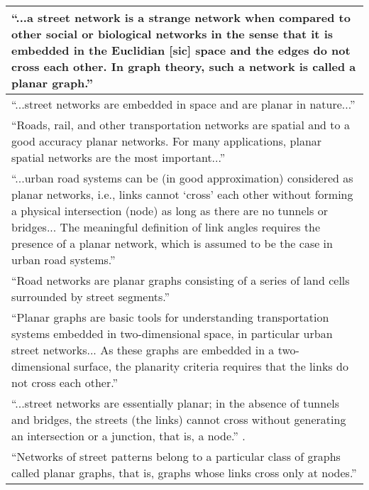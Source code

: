 \begin{tabular}{ | p{\textwidth} | }
\enquote{...a street network is a strange network when compared to other social or biological networks in the sense that it is embedded in the Euclidian [sic] space and the edges do not cross each other. In graph theory, such a network is called a planar graph.} \citep[p.~259]{masucci_random_2009} \\ \hline

\enquote{...street networks are embedded in space and are planar in nature...} \citep[p.~114]{porta_networks_2010} \\ \hline

\enquote{Roads, rail, and other transportation networks are spatial and to a good accuracy planar networks. For many applications, planar spatial networks are the most important...} \citep[p.~3]{barthelemy_spatial_2011} \\ \hline

\enquote{...urban road systems can be (in good approximation) considered as planar networks, i.e., links cannot \enquote{cross} each other without forming a physical intersection (node) as long as there are no tunnels or bridges... The meaningful definition of link angles requires the presence of a planar network, which is assumed to be the case in urban road systems.} \citep[pp.~563~\&~567]{chan_urban_2011} \\ \hline

\enquote{Road networks are planar graphs consisting of a series of land cells surrounded by street segments.} \citep[p.~3]{strano_elementary_2012} \\ \hline

\enquote{Planar graphs are basic tools for understanding transportation systems embedded in two-dimensional space, in particular urban street networks... As these graphs are embedded in a two-dimensional surface, the
planarity criteria requires that the links do not cross each other.} \citep[p.~1]{masucci_limited_2013} \\ \hline

\enquote{...street networks are essentially planar; in the absence of tunnels and bridges, the streets (the links) cannot cross without generating an intersection or a junction, that is, a node.} \citep[p.~1]{gudmundsson_entropy_2013}. \\ \hline

\enquote{Networks of street patterns belong to a particular class of graphs called planar graphs, that is, graphs whose links cross only at nodes.} \citep[p.~1074]{strano_urban_2013} \\ \hline


\end{tabular}
